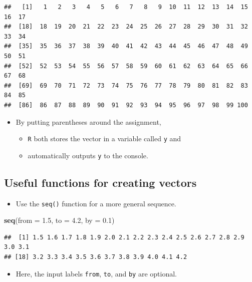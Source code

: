 \documentclass[]{book}
\newenvironment{Shaded}{\begin{snugshade}}{\end{snugshade}}
\newcommand{\KeywordTok}[1]{\textcolor[rgb]{0.13,0.29,0.53}{\textbf{#1}}}
\newcommand{\DataTypeTok}[1]{\textcolor[rgb]{0.13,0.29,0.53}{#1}}
\newcommand{\FloatTok}[1]{\textcolor[rgb]{0.00,0.00,0.81}{#1}}
\newcommand{\NormalTok}[1]{#1}
\providecommand{\tightlist}{%
  \setlength{\itemsep}{0pt}\setlength{\parskip}{0pt}}
\begin{document}
\begin{verbatim}
##   [1]   1   2   3   4   5   6   7   8   9  10  11  12  13  14  15  16  17
##  [18]  18  19  20  21  22  23  24  25  26  27  28  29  30  31  32  33  34
##  [35]  35  36  37  38  39  40  41  42  43  44  45  46  47  48  49  50  51
##  [52]  52  53  54  55  56  57  58  59  60  61  62  63  64  65  66  67  68
##  [69]  69  70  71  72  73  74  75  76  77  78  79  80  81  82  83  84  85
##  [86]  86  87  88  89  90  91  92  93  94  95  96  97  98  99 100
\end{verbatim}

\begin{itemize}
\tightlist
\item
  By putting parentheses around the assignment,

  \begin{itemize}
  \tightlist
  \item
    \texttt{R} both stores the vector in a variable called \texttt{y}
    and
  \item
    automatically outputs \texttt{y} to the console.
  \end{itemize}
\end{itemize}

\subsection{Useful functions for creating
vectors}\label{useful-functions-for-creating-vectors}

\begin{itemize}
\tightlist
\item
  Use the \texttt{seq()} function for a more general sequence.
\end{itemize}

\begin{Shaded}
\begin{Highlighting}[]
\KeywordTok{seq}\NormalTok{(}\DataTypeTok{from =} \FloatTok{1.5}\NormalTok{, }\DataTypeTok{to =} \FloatTok{4.2}\NormalTok{, }\DataTypeTok{by =} \FloatTok{0.1}\NormalTok{)}
\end{Highlighting}
\end{Shaded}

\begin{verbatim}
##  [1] 1.5 1.6 1.7 1.8 1.9 2.0 2.1 2.2 2.3 2.4 2.5 2.6 2.7 2.8 2.9 3.0 3.1
## [18] 3.2 3.3 3.4 3.5 3.6 3.7 3.8 3.9 4.0 4.1 4.2
\end{verbatim}

\begin{itemize}
\tightlist
\item
  Here, the input labels \texttt{from}, \texttt{to}, and \texttt{by} are
  optional.
\end{itemize}
\end{document}
